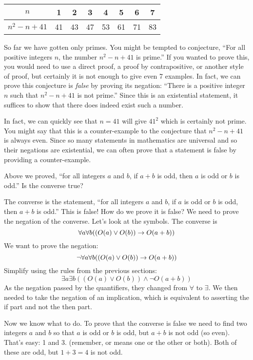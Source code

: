 \documentclass[12pt]{article}
\begin{document}
\begin{center}
\begin{tabular}{c|c|c|c|c|c|c|c}
$n$ & 1 & 2 & 3 & 4 & 5 & 6 & 7\\ \hline
$n^2 - n + 41$ & 41 & 43 & 47 & 53 & 61 & 71 & 83
 \end{tabular}
\end{center}

So far we have gotten only primes.  You might be tempted to conjecture, ``For all positive integers $n$, the number $n^2 - n + 41$ is prime.''  If you wanted to prove this, you would need to use a direct proof, a proof by contrapositive, or another style of proof, but certainly it is not enough to give even 7 examples.  In fact, we can prove this conjecture is {\em false} by proving its negation: ``There is a positive integer $n$ such that $n^2 - n + 41$ is not prime.''  Since this is an existential statement, it suffices to show that there does indeed exist such a number.

In fact, we can quickly see that $n = 41$ will give $41^2$ which is certainly not prime.  You might say that this is a counter-example to the conjecture that $n^2 - n + 41$ is always even.  Since so many statements in mathematics are universal and so their negations are existential, we can often prove that a statement is false by providing a counter-example.

\begin{example}
     Above we proved, ``for all integers $a$ and $b$, if $a+b$ is odd, then $a$ is odd or $b$ is odd.''  Is the converse true?
     
     \begin{solution}
     The converse is the statement, ``for all integers $a$ and $b$, if $a$ is odd or $b$ is odd, then $a + b$ is odd.''  This is false!  How do we prove it is false?  We need to prove the negation of the converse.  Let's look at the symbols.  The converse is
          \[\forall a \forall b ((O(a) \vee O(b)) \rightarrow O(a+b))\]
          We want to prove the negation:
          \[\neg \forall a \forall b ((O(a) \vee O(b)) \rightarrow O(a+b))\]
          Simplify using the rules from the previous sections:
          \[\exists a \exists b ((O(a) \vee O(b)) \wedge \neg O(a+b))\]
          As the negation passed by the quantifiers, they changed from $\forall$ to $\exists$.  We then needed to take the negation of an implication, which is equivalent to asserting the if part and not the then part.  
          
          Now we know what to do.  To prove that the converse is false we need to find two integers $a$ and $b$ so that $a$ is odd or $b$ is odd, but $a+b$ is not odd (so even).  That's easy: 1 and 3.  (remember, or means one or the other or both).  Both of these are odd, but $1+3 = 4$ is not odd.
     \end{solution}
     
\end{example}
 
\end{document}
